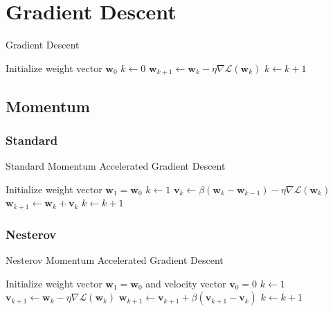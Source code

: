\section{Gradient Descent}

\begin{algorithm}[h!]
	\caption{Gradient Descent}
	\label{alg:gd}
	\begin{algorithmic}[1]
			\State Initialize weight vector $\textbf{w}_0$
			\State $k \gets 0$
				\State $\textbf{w}_{k+1} \gets \textbf{w}_k - \eta \nabla \mathcal{L}(\textbf{w}_k)$
				\State $k \gets k + 1$
			\EndWhile
		\EndProcedure
	\end{algorithmic}
\end{algorithm}

\subsection{Momentum}



\subsubsection{Standard}

\begin{algorithm}[h!]
	\caption{Standard Momentum Accelerated Gradient Descent}
	\label{alg:sgd}
	\begin{algorithmic}[1]
			\State Initialize weight vector $\textbf{w}_1 = \textbf{w}_0$
			\State $k \gets 1$
				\State $\textbf{v}_{k} \gets \beta (\textbf{w}_k - \textbf{w}_{k-1}) - \eta \nabla \mathcal{L}(\textbf{w}_k)$
				\State $\textbf{w}_{k+1} \gets \textbf{w}_k + \textbf{v}_{k}$
				\State $k \gets k + 1$
			\EndWhile
		\EndProcedure
	\end{algorithmic}
\end{algorithm}

\subsubsection{Nesterov}

\begin{algorithm}[h!]
	\caption{Nesterov Momentum Accelerated Gradient Descent}
	\label{alg:ngd}
	\begin{algorithmic}[1]
			\State Initialize weight vector $\textbf{w}_1 = \textbf{w}_0$ and velocity vector $\textbf{v}_0 = 0$
			\State $k \gets 1$
				\State $\textbf{v}_{k+1} \gets  \textbf{w}_k - \eta \nabla \mathcal{L}(\textbf{w}_k)$
				\State $\textbf{w}_{k+1} \gets \textbf{v}_{k+1} + \beta (\textbf{v}_{k+1} - \textbf{v}_k)$
				\State $k \gets k + 1$
			\EndWhile
		\EndProcedure
	\end{algorithmic}
\end{algorithm}